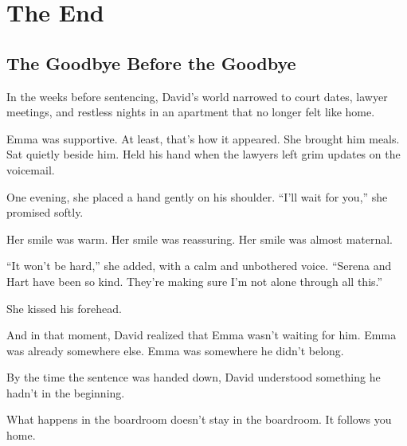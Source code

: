 \section{The End}

\subsection{The Goodbye Before the Goodbye}

In the weeks before sentencing, David’s world narrowed to court dates, lawyer meetings, and restless 
nights in an apartment that no longer felt like home.

Emma was supportive. At least, that’s how it appeared.  
She brought him meals. Sat quietly beside him. Held his hand when the lawyers left grim updates on the voicemail.

One evening, she placed a hand gently on his shoulder.  
“I’ll wait for you,” she promised softly.  

Her smile was warm. Her smile was reassuring. Her smile was almost maternal.  

“It won’t be hard,” she added, with a calm and unbothered voice.
“Serena and Hart have been so kind. They’re making sure I’m not alone through all this.”

She kissed his forehead.

And in that moment, David realized that 
Emma wasn’t waiting for him.  
Emma was already somewhere else.  
Emma was somewhere he didn't belong.

By the time the sentence was handed down,  
David understood something he hadn’t in the beginning. 

What happens in the boardroom doesn't stay in the boardroom.  It follows you home.

\medskip

